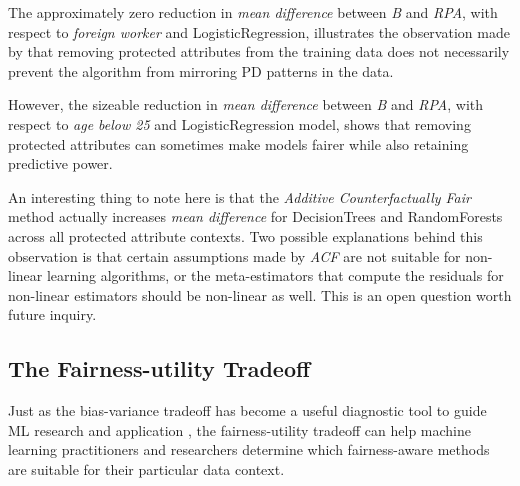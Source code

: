 \documentclass[man,natbib]{apa6}
\begin{document}
The approximately zero reduction in \emph{mean difference} between \emph{B} and
\emph{RPA}, with respect to \emph{foreign worker} and LogisticRegression,
illustrates the observation made by \cite{kusner2017counterfactual} that
removing protected attributes from the training data does not necessarily
prevent the algorithm from mirroring PD patterns in the data.

However, the sizeable reduction in \emph{mean difference} between \emph{B} and
\emph{RPA}, with respect to \emph{age below 25} and LogisticRegression model,
shows that removing protected attributes can sometimes make models fairer
while also retaining predictive power.

An interesting thing to note here is that the \emph{Additive Counterfactually
Fair} method actually increases \emph{mean difference} for DecisionTrees and
RandomForests across all protected attribute contexts. Two possible explanations
behind this observation is that certain assumptions made by \emph{ACF} are not
suitable for non-linear learning algorithms, or the meta-estimators that compute
the residuals for non-linear estimators should be non-linear as well. This
is an open question worth future inquiry.

\subsection{The Fairness-utility Tradeoff}

Just as the bias-variance tradeoff has become a useful diagnostic tool to guide
ML research and application \cite{fortmann2012understanding}, the fairness-utility
tradeoff can help machine learning practitioners and researchers
determine which fairness-aware methods are suitable for their particular data
context.
\end{document}
